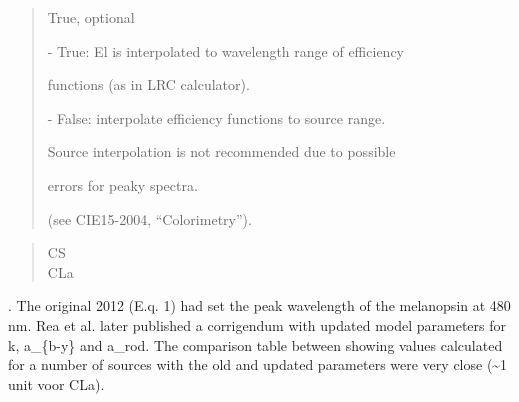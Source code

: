 \documentclass[letterpaper,10pt,english]{sphinxmanual}
\begin{document}
\begin{fulllineitems}
\begin{description}
\begin{quote}
\begin{description}
\item[{interpolate\_sources}] \leavevmode
\begin{DUlineblock}{0em}
\item[] True, optional
\item[]
\begin{DUlineblock}{\DUlineblockindent}
\item[] - True: El is interpolated to wavelength range of efficiency 
\item[]
\begin{DUlineblock}{\DUlineblockindent}
\item[] functions (as in LRC calculator). 
\end{DUlineblock}
\item[] - False: interpolate efficiency functions to source range. 
\item[]
\begin{DUlineblock}{\DUlineblockindent}
\item[] Source interpolation is not recommended due to possible
\item[] errors for peaky spectra. 
\item[] (see CIE15-2004, “Colorimetry”).
\end{DUlineblock}
\end{DUlineblock}
\end{DUlineblock}

\end{description}\end{quote}

\item[{Returns:}] \leavevmode\begin{quote}\begin{description}
\item[{CS}] \leavevmode
{}

\item[{CLa}] \leavevmode
{}

\end{description}\end{quote}

\item[{Notes:}] . The original 2012 (E.q. 1) had set the peak wavelength of the 
melanopsin at 480 nm. Rea et al. later published a corrigendum with 
updated model parameters for k, a\_\{b-y\} and a\_rod. The comparison table
between showing values calculated for a number of sources with the old
and updated parameters were very close (\textasciitilde{}1 unit voor CLa).


\end{description}
\end{fulllineitems}
\end{document}
